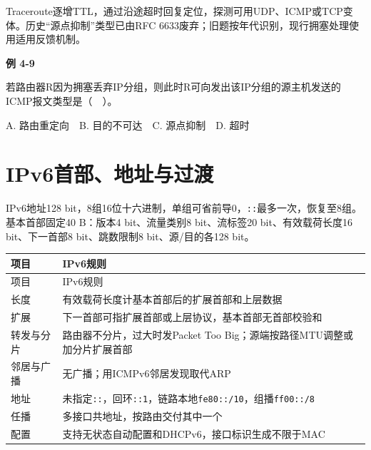 Traceroute逐增TTL，通过沿途超时回复定位，探测可用UDP、ICMP或TCP变体。历史``源点抑制''类型已由RFC 6633废弃；旧题按年代识别，现行拥塞处理使用适用反馈机制。

\par\medskip{}\noindent\hypertarget{CN04-E08}{}\label{CN04-E08}\textbf{例 4-9}\par\nobreak\smallskip

若路由器R因为拥塞丢弃IP分组，则此时R可向发出该IP分组的源主机发送的ICMP报文类型是（　）。

A. 路由重定向　B. 目的不可达　C. 源点抑制　D. 超时

\section{IPv6首部、地址与过渡}\label{CN04-ipv6}

IPv6地址128 bit，8组16位十六进制，单组可省前导0，\texttt{:\allowbreak{}:\allowbreak{}}最多一次，恢复至8组。基本首部固定40 B：版本4 bit、流量类别8 bit、流标签20 bit、有效载荷长度16 bit、下一首部8 bit、跳数限制8 bit、源/目的各128 bit。

\par\smallskip
{\fontsize{9.3}{12}\selectfont\setlength{\tabcolsep}{2.5pt}\setlength{\LTleft}{0pt}\setlength{\LTright}{0pt}
\begin{longtable}{@{}>{\raggedright\arraybackslash}p{}>{\raggedright\arraybackslash}p{}@{}}
\toprule
项目 & IPv6规则 \\

\midrule\endfirsthead\toprule
项目 & IPv6规则 \\

\midrule\endhead\bottomrule\endfoot
长度 & 有效载荷长度计基本首部后的扩展首部和上层数据 \\

扩展 & 下一首部可指扩展首部或上层协议，基本首部无首部校验和 \\

转发与分片 & 路由器不分片，过大时发Packet Too Big；源端按路径MTU调整或加分片扩展首部 \\

邻居与广播 & 无广播；用ICMPv6邻居发现取代ARP \\

地址 & 未指定\texttt{::}，回环\texttt{::1}，链路本地\texttt{fe80::/10}，组播\texttt{ff00::/8} \\

任播 & 多接口共地址，按路由交付其中一个 \\

配置 & 支持无状态自动配置和DHCPv6，接口标识生成不限于MAC \\

\end{longtable}}
\par\smallskip

